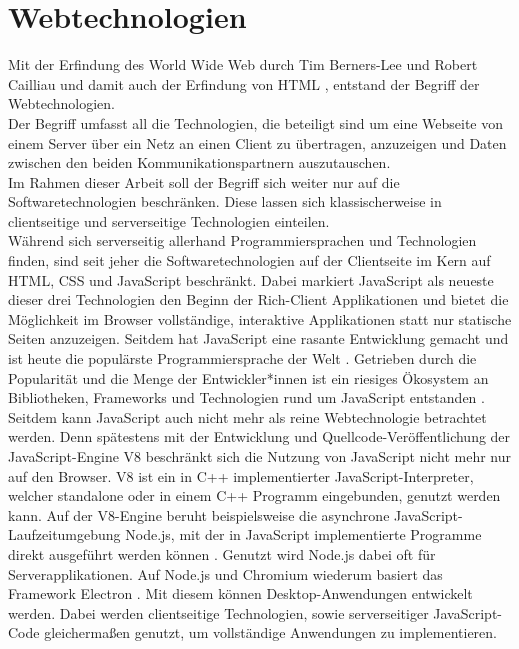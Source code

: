 \section{Webtechnologien}
\label{sec:webtechnologien}

Mit der Erfindung des World Wide Web durch Tim Berners-Lee und Robert Cailliau und damit auch der Erfindung 
von HTML \cite{www}, entstand der Begriff der Webtechnologien.\\
Der Begriff umfasst all die Technologien, die beteiligt sind um eine Webseite von einem Server über ein Netz 
an einen Client zu übertragen, anzuzeigen und Daten zwischen den beiden Kommunikationspartnern auszutauschen.\\

Im Rahmen dieser Arbeit soll der Begriff sich weiter nur auf die Softwaretechnologien beschränken. 
Diese lassen sich klassischerweise in clientseitige und serverseitige Technologien einteilen.\\
Während sich serverseitig allerhand Programmiersprachen und Technologien finden, sind seit jeher die Softwaretechnologien
auf der Clientseite im Kern auf HTML, CSS und JavaScript beschränkt. Dabei markiert JavaScript als neueste dieser
drei Technologien \cite{jspress} den Beginn der Rich-Client Applikationen und bietet die Möglichkeit im Browser 
vollständige, interaktive Applikationen statt nur statische Seiten anzuzeigen. Seitdem hat JavaScript eine rasante 
Entwicklung gemacht und ist heute die populärste Programmiersprache der Welt \cite{npmstat}. Getrieben durch 
die Popularität und die Menge der Entwickler*innen ist ein riesiges Ökosystem an Bibliotheken, Frameworks
und Technologien rund um JavaScript entstanden \cite{npmstat}. Seitdem kann JavaScript auch nicht mehr als reine Webtechnologie
betrachtet werden.
Denn spätestens mit der Entwicklung und Quellcode-Veröffentlichung der JavaScript-Engine V8 \cite{v8} beschränkt 
sich die Nutzung von JavaScript nicht mehr nur auf den Browser. V8 ist ein in C++ implementierter JavaScript-Interpreter, 
welcher standalone oder in einem C++ Programm eingebunden, genutzt werden kann. Auf der V8-Engine beruht beispielsweise 
die asynchrone JavaScript-Laufzeitumgebung Node.js, mit der in JavaScript implementierte Programme direkt ausgeführt 
werden können \cite{node}. Genutzt wird Node.js dabei oft für Serverapplikationen.
Auf Node.js und Chromium wiederum basiert das Framework Electron \cite{electron}. Mit diesem können Desktop-Anwendungen
entwickelt werden. Dabei werden clientseitige Technologien, sowie serverseitiger JavaScript-Code gleichermaßen
genutzt, um vollständige Anwendungen zu implementieren.\\

